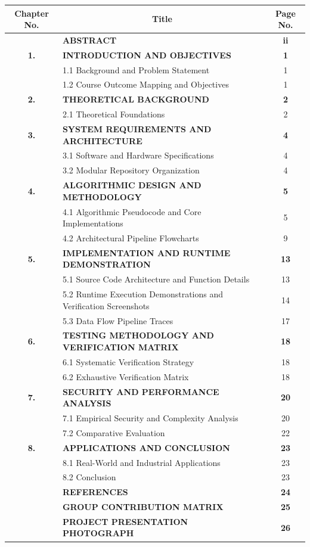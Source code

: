 \documentclass[12pt,a4paper]{report}
\begin{document}
\begin{table}[h!]
\centering
\fontsize{10.5}{13.5}\selectfont
\begin{tabular}{|c|p{4.7in}|c|}
\hline
\rowcolor{tableheader}
\textbf{Chapter No.} & \multicolumn{1}{c|}{\textbf{Title}} & \textbf{Page No.} \\
\hline
& \textbf{ABSTRACT} & \textbf{ii} \\
\hline
\textbf{1.} & \textbf{INTRODUCTION AND OBJECTIVES} & \textbf{1} \\
& 1.1 Background and Problem Statement & 1 \\
& 1.2 Course Outcome Mapping and Objectives & 1 \\
\hline
\textbf{2.} & \textbf{THEORETICAL BACKGROUND} & \textbf{2} \\
& 2.1 Theoretical Foundations & 2 \\
\hline
\textbf{3.} & \textbf{SYSTEM REQUIREMENTS AND ARCHITECTURE} & \textbf{4} \\
& 3.1 Software and Hardware Specifications & 4 \\
& 3.2 Modular Repository Organization & 4 \\
\hline
\textbf{4.} & \textbf{ALGORITHMIC DESIGN AND METHODOLOGY} & \textbf{5} \\
& 4.1 Algorithmic Pseudocode and Core Implementations & 5 \\
& 4.2 Architectural Pipeline Flowcharts & 9 \\
\hline
\textbf{5.} & \textbf{IMPLEMENTATION AND RUNTIME DEMONSTRATION} & \textbf{13} \\
& 5.1 Source Code Architecture and Function Details & 13 \\
& 5.2 Runtime Execution Demonstrations and Verification Screenshots & 14 \\
& 5.3 Data Flow Pipeline Traces & 17 \\
\hline
\textbf{6.} & \textbf{TESTING METHODOLOGY AND VERIFICATION MATRIX} & \textbf{18} \\
& 6.1 Systematic Verification Strategy & 18 \\
& 6.2 Exhaustive Verification Matrix & 18 \\
\hline
\textbf{7.} & \textbf{SECURITY AND PERFORMANCE ANALYSIS} & \textbf{20} \\
& 7.1 Empirical Security and Complexity Analysis & 20 \\
& 7.2 Comparative Evaluation & 22 \\
\hline
\textbf{8.} & \textbf{APPLICATIONS AND CONCLUSION} & \textbf{23} \\
& 8.1 Real-World and Industrial Applications & 23 \\
& 8.2 Conclusion & 23 \\
\hline
& \textbf{REFERENCES} & \textbf{24} \\
\hline
& \textbf{GROUP CONTRIBUTION MATRIX} & \textbf{25} \\
\hline
& \textbf{PROJECT PRESENTATION PHOTOGRAPH} & \textbf{26} \\
\hline
\end{tabular}
\end{table}
\end{document}
